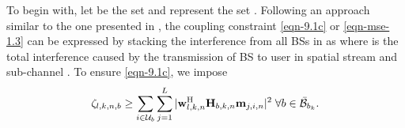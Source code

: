 To begin with, let  be the set  and  represent the set . Following an approach similar to the one presented in \cite{pennanen2011decentralized,tolli2011decentralized}, the coupling constraint \eqref{eqn-9.1c} or \eqref{eqn-mse-1.3} can be 
expressed by stacking the interference from all \acp{BS} in  as
\iftoggle{single_column}{
\begin{equation}\label{eqn-decent-3}
\beta_{l,k,n} \geq \sum_{\substack{j = 1\\j \neq l}}^L |\mvec{w}{l,k,n}^\herm \mvec{H}{b_k,k,n} \mvec{m}{j,k,n} |^2 + \sum_{i \in \mc{U}_{b_k} \backslash \{k\}} \sum_{j = 1}^L |\mvec{w}{l,k,n}^\herm \mvec{H}{b_k,k,n} \mvec{m}{j,i,n} |^2 + \sum_{b \in \bar{\mc{B}}_{b_k}} \zeta_{l,k,n,b} \; + \; \enoise
\end{equation}}{\allowdisplaybreaks
\begin{multline}\label{eqn-decent-3}
\enoise + \sum_{\substack{j = 1,j \neq l}}^L |\mvec{w}{l,k,n}^\herm \mvec{H}{b_k,k,n} \mvec{m}{j,k,n} |^2 + \sum_{b \in \bar{\mc{B}}_{b_k}} \zeta_{l,k,n,b}  \\
+ \sum_{i \in \mc{U}_{b_k} \backslash \{k\}} \sum_{j = 1}^L |\mvec{w}{l,k,n}^\herm \mvec{H}{b_k,k,n} \mvec{m}{j,i,n} |^2 \leq \beta_{l,k,n}
\end{multline}}
where  is the total interference caused by the transmission of \ac{BS}  to user  in spatial stream  and sub-channel . To ensure \eqref{eqn-9.1c}, we impose
\begin{equation} \label{inter_exp}
\zeta_{l,k,n,b} \geq \sum_{i \in \mc{U}_b} \sum_{j = 1}^L |\mvec{w}{l,k,n}^\herm \mvec{H}{b,k,n} \mvec{m}{j,i,n} |^2 \; \forall b \in \bar{\mc{B}}_{b_k}.
\end{equation}

